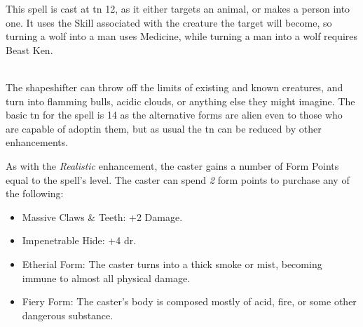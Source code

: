 \begin{multicols}{2}
This spell is cast at \gls{tn} 12, as it either targets an animal, or makes a person into one.  It uses the Skill associated with the creature the target will become, so turning a wolf into a man uses Medicine, while turning a man into a wolf requires Beast Ken.

\spelllevel

\\
The shapeshifter can throw off the limits of existing and known creatures, and turn into flamming bulls, acidic clouds, or anything else they might imagine.  The basic \gls{tn} for the spell is 14 as the alternative forms are alien even to those who are capable of adoptin them, but as usual the \gls{tn} can be reduced by other enhancements.

As with the \textit{Realistic} enhancement, the caster gains a number of Form Points equal to the spell's level.  The caster can spend \textit{2} form points to purchase any of the following:

\begin{itemize}

	\item{Massive Claws \& Teeth: +2 Damage.}
	\item{Impenetrable Hide: +4 \gls{dr}.}
	\item{Etherial Form: The caster turns into a thick smoke or mist, becoming immune to almost all physical damage.}
	\item{Fiery Form: The caster's body is composed mostly of acid, fire, or some other dangerous substance.  }

\end{itemize}

\end{multicols}


